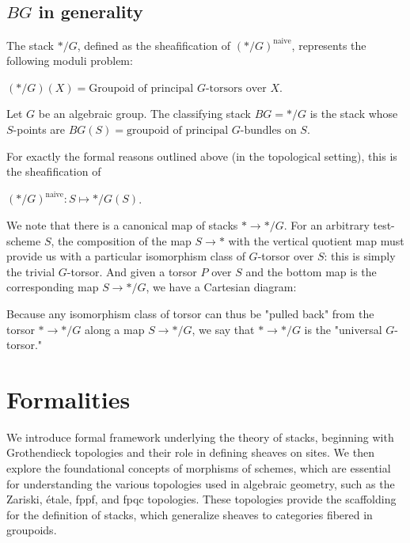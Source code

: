 \documentclass[12pt]{article}
\begin{document}
\subsection{$BG$ in generality}
\begin{proposition}
    The stack $*/G$, defined as the sheafification of $(*/G)^{\text{naive}}$, represents the following moduli problem:
    \begin{center}
        $(*/G)(X) = \text{Groupoid of principal } G\text{-torsors over } X$.
    \end{center}
\end{proposition}

\begin{definition}
    Let $G$ be an algebraic group. The classifying stack $BG = */G$ is the stack whose $S$-points are $BG(S) = \text{groupoid of principal } G\text{-bundles on } S$.
\end{definition}
For exactly the formal reasons outlined above (in the topological setting), this is the sheafification of
\begin{center}
    $(*/G)^{\text{naive}} : S \mapsto */G(S)$.
\end{center}
We note that there is a canonical map of stacks $* \to */G$. For an arbitrary test-scheme $S$, the composition of the map $S \to *$ with the vertical quotient map must provide us with a particular isomorphism class of $G$-torsor over $S$: this is simply the trivial $G$-torsor. And given a torsor $P$ over $S$ and the bottom map is the corresponding map $S \to */G$, we have a Cartesian diagram:
\begin{center}
\end{center}

Because any isomorphism class of torsor can thus be "pulled back" from the torsor $* \to */G$ along a map $S \to */G$, we say that $* \to */G$ is the "universal $G$-torsor."

\section{Formalities}
We introduce formal framework underlying the theory of stacks, beginning with Grothendieck topologies and their role in defining sheaves on sites. We then explore the foundational concepts of morphisms of schemes, which are essential for understanding the various topologies used in algebraic geometry, such as the Zariski, étale, fppf, and fpqc topologies. These topologies provide the scaffolding for the definition of stacks, which generalize sheaves to categories fibered in groupoids.
\end{document}
